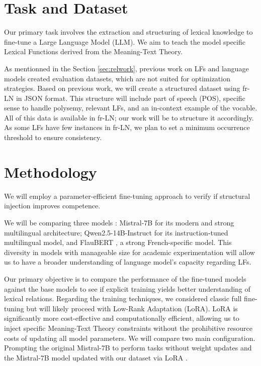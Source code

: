 \documentclass[11pt]{article}
\begin{document}
\section{Task and Dataset} \label{sec:task}


Our primary task involves the extraction and structuring of lexical knowledge
to fine-tune a Large Language Model (LLM). We aim to teach the model specific
Lexical Functions derived from the Meaning-Text Theory.

As mentionned in the Section \ref{sec:relwork}, previous work on LFs and
language models created evaluation datasets, which are not suited for
optimization strategies. Based on previous work, we will create a structured
dataset using fr-LN \citep{11403/lexical-system-fr/v3.2} in JSON format. This
structure will include part of speech (POS), specific sense to handle polysemy,
relevant LFs, and an in-context example of the vocable. All of this data is
available in fr-LN; our work will be to structure it accordingly. As some LFs
have few instances in fr-LN, we plan to set a minimum occurrence threshold to
ensure consistency.


\section{Methodology}
We will employ a parameter-efficient fine-tuning approach to verify if
structural injection improves competence.

We will be comparing three models : Mistral-7B
\citep{jiangMistral7B2023} for its modern and strong multilingual architecture;
Qwen2.5-14B-Instruct \citep{qwen2} for its instruction-tuned multilingual
model, and FlauBERT \citep{leFlauBERTUnsupervisedLanguage2020}, a strong
French-specific model. This diversity in models with manageable size for
academic experimentation will allow us to have a
broader understanding of language model's capacity regarding LFs.

Our primary objective is to compare the performance of the fine-tuned models
against the base models to see if explicit training yields better understanding
of lexical relations. Regarding the training techniques, we considered classic
full fine-tuning but will likely proceed with Low-Rank Adaptation (LoRA). LoRA
is significantly more cost-effective and computationally efficient, allowing us
to inject specific Meaning-Text Theory constraints without the prohibitive
resource costs of updating all model parameters. We will compare two main
configuration. Prompting the original Mistral-7B to perform tasks without
weight updates and the Mistral-7B model updated with our dataset via LoRA
\citep{LoRA}.
\end{document}
